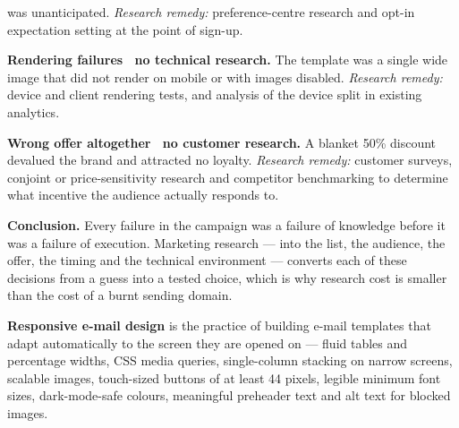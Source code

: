 \begin{qlist}
\begin{apts}
      was unanticipated. \emph{Research remedy:} preference-centre research and
      opt-in expectation setting at the point of sign-up.
\item \textbf{Rendering failures \ra\ no technical research.} The template was
      a single wide image that did not render on mobile or with images
      disabled. \emph{Research remedy:} device and client rendering tests, and
      analysis of the device split in existing analytics.
\item \textbf{Wrong offer altogether \ra\ no customer research.} A blanket 50\%
      discount devalued the brand and attracted no loyalty. \emph{Research
      remedy:} customer surveys, conjoint or price-sensitivity research and
      competitor benchmarking to determine what incentive the audience actually
      responds to.
\end{apts}

\textbf{Conclusion.} Every failure in the campaign was a failure of knowledge
before it was a failure of execution. Marketing research --- into the list, the
audience, the offer, the timing and the technical environment --- converts each
of these decisions from a guess into a tested choice, which is why research
cost is smaller than the cost of a burnt sending domain.

\textbf{Responsive e-mail design} is the practice of building e-mail templates
that adapt automatically to the screen they are opened on --- fluid tables and
percentage widths, CSS media queries, single-column stacking on narrow screens,
scalable images, touch-sized buttons of at least 44 pixels, legible minimum
font sizes, dark-mode-safe colours, meaningful preheader text and alt text for
blocked images.


\end{qlist}
